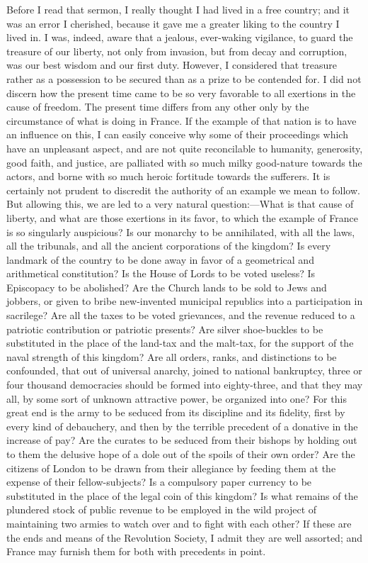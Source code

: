 Before I read that sermon, I really thought I had lived in a free country; and it was an error I cherished, because it gave me a greater liking to the country I lived in. I was, indeed, aware that a jealous, ever-waking vigilance, to guard the treasure of our liberty, not only from invasion, but from decay and corruption, was our best wisdom and our first duty. However, I considered that treasure rather as a possession to be secured than as a prize to be contended for. I did not discern how the present time came to be so very favorable to all exertions in the cause of freedom. The present time differs from any other only by the circumstance of what is doing in France. If the example of that nation is to have an influence on this, I can easily conceive why some of their proceedings which have an unpleasant aspect, and are not quite reconcilable to humanity, generosity, good faith, and justice, are palliated with so much milky good-nature towards the actors, and borne with so much heroic fortitude towards the sufferers. It is certainly not prudent to discredit the authority of an example we mean to follow. But allowing this, we are led to a very natural question:—What is that cause of liberty, and what are those exertions in its favor, to which the example of France is so singularly auspicious? Is our monarchy to be annihilated, with all the laws, all the tribunals, and all the ancient corporations of the kingdom? Is every landmark of the country to be done away in favor of a geometrical and arithmetical constitution? Is the House of Lords to be voted useless? Is Episcopacy to be abolished? Are the Church lands to be sold to Jews and jobbers, or given to bribe new-invented municipal republics into a participation in sacrilege? Are all the taxes to be voted grievances, and the revenue reduced to a patriotic contribution or patriotic presents? Are silver shoe-buckles to be substituted in the place of the land-tax and the malt-tax, for the support of the naval strength of this kingdom? Are all orders, ranks, and distinctions to be confounded, that out of universal anarchy, joined to national bankruptcy, three or four thousand democracies should be formed into eighty-three, and that they may all, by some sort of unknown attractive power, be organized into one? For this great end is the army to be seduced from its discipline and its fidelity, first by every kind of debauchery, and then by the terrible precedent of a donative in the increase of pay? Are the curates to be seduced from their bishops by holding out to them the delusive hope of a dole out of the spoils of their own order? Are the citizens of London to be drawn from their allegiance by feeding them at the expense of their fellow-subjects? Is a compulsory paper currency to be substituted in the place of the legal coin of this kingdom? Is what remains of the plundered stock of public revenue to be employed in the wild project of maintaining two armies to watch over and to fight with each other? If these are the ends and means of the Revolution Society, I admit they are well assorted; and France may furnish them for both with precedents in point.


